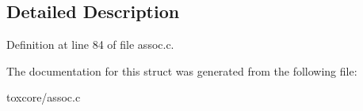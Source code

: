 \subsection{Detailed Description}


Definition at line 84 of file assoc.\+c.



The documentation for this struct was generated from the following file\+:\begin{DoxyCompactItemize}
\item 
toxcore/assoc.\+c\end{DoxyCompactItemize}
